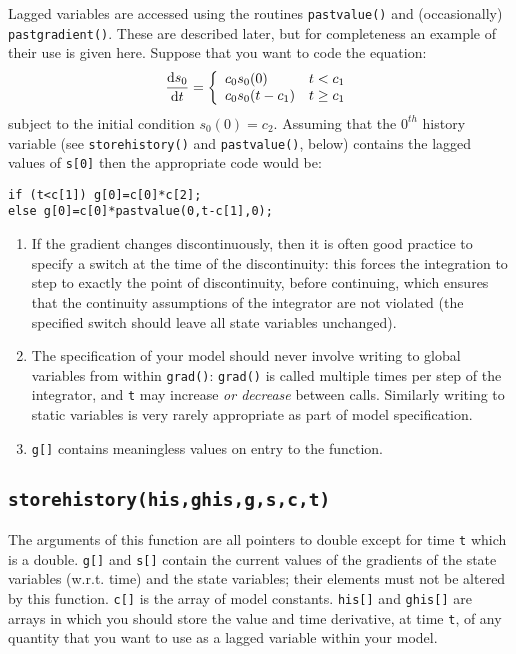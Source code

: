\documentclass[10pt] {article}
\newcommand{\dif}[2]{\frac{{\rm d} #1}{{\rm d} #2}}
\begin{document}
Lagged variables are accessed using the routines \verb+pastvalue()+ and (occasionally) %
\verb+pastgradient()+. These are described later, but for completeness an example of their use is %
given here. Suppose that you want to code the equation:
$$
\dif{s_0}{t} = \left \{ \begin{array}{lc} c_0s_0(0) & t<c_1 \\ c_0s_0(t-c_1) & t\ge c_1 %
\end{array} \right .
$$
subject to the initial condition $s_0(0)=c_2$. Assuming that the $0^{th}$ history variable (see %
\verb+storehistory()+ and \verb+pastvalue()+, below) contains the lagged values of \verb+s[0]+ %
then the appropriate code would be:
\begin{verbatim}
if (t<c[1]) g[0]=c[0]*c[2];
else g[0]=c[0]*pastvalue(0,t-c[1],0);
\end{verbatim}
\begin{enumerate}
\item If the gradient changes discontinuously, then it is often good practice to specify a switch %
at the time of the discontinuity: this forces the integration to step to exactly the point of %
discontinuity, before continuing, which ensures that the continuity assumptions of the integrator %
are not violated (the specified switch should leave all state variables unchanged).
\item The specification of your model should never involve writing to global variables from %
within \verb+grad()+: \verb+grad()+ is called multiple times per step of the integrator, and %
\verb+t+ may increase {\it or decrease} between calls. Similarly writing to static variables is %
very rarely appropriate as part of model specification. 
\item \verb+g[]+ contains meaningless values on entry to the function.  
\end{enumerate} 

\subsection{\tt storehistory(his,ghis,g,s,c,t)} 

The arguments of this function are all pointers to double except for time \verb+t+ which is a %
double. \verb+g[]+ and \verb+s[]+ contain the current values of the gradients of the state %
variables (w.r.t. time) and the state variables; their elements must not be altered by this %
function. \verb+c[]+ is the array of model constants. \verb+his[]+ and \verb+ghis[]+ are arrays %
in which you should store the value and time derivative, at time \verb+t+, of any quantity that %
you want to use as a lagged variable within your model.  
\end{document}
